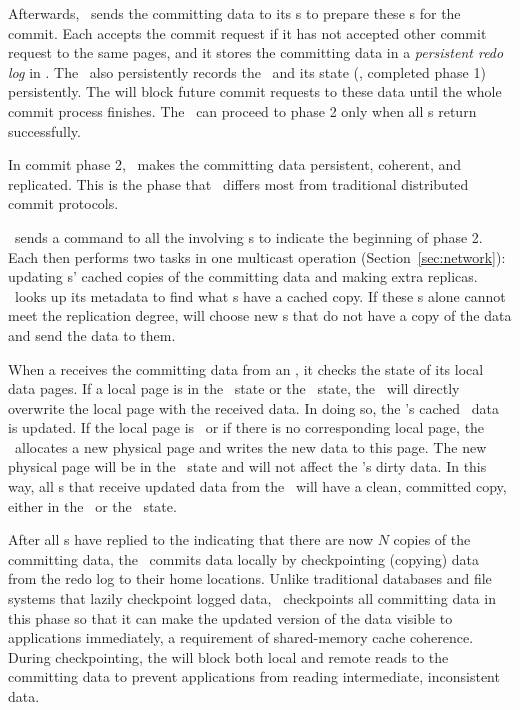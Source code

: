 Afterwards, \xn\ sends the committing data to its \on{}s 
to prepare these \on{}s for the commit.
Each \on{} accepts the commit request if it has not accepted other commit request to the same pages,
and it stores the committing data in a {\em persistent redo log} in \nvm.
The \on\ also persistently records the \xactid\ and its state (\ie, completed phase 1) persistently.
The \on{} will block future commit requests to these data until the whole commit process finishes.
The \xn\ can proceed to phase 2 only when all \on{}s return successfully.

In commit phase 2, \hotpot\ makes the committing data persistent, 
coherent, and replicated.
This is the phase that \hotpot\ differs most from traditional distributed commit protocols.

\xn\ sends a command to all the involving \on{}s to indicate the beginning of phase 2.  
Each \on{} then performs two tasks in one multicast operation (Section~\ref{sec:network}): 
updating \dn{}s' cached copies of the committing data and making extra replicas.
\on\ looks up its metadata to find what \dn{}s have a cached copy.
If these \dn{}s alone cannot meet the replication degree, \on{} will choose new \dn{}s that do not have
a copy of the data and send the data to them.

When a \dn{} receives the committing data from an \on,
it checks the state of its local data pages.
If a local page is in the \committed\ state or the \redundant\ state, 
the \dn\ will directly overwrite the local page with the received data.
In doing so, the \dn's cached \nvm\ data is updated.
If the local page is \dirty\  or if there is no corresponding local page,
the \dn\ allocates a new physical page and writes the new data to this page.
The new physical page will be in the \redundant\ state and will not affect the \dn's dirty data.
In this way, all \dn{}s that receive updated data from the \on\ will 
have a clean, committed copy, either in the \committed\ or the \redundant\ state.

After all \dn{}s have replied to the \on{} indicating that there are now $N$ copies of the committing data,
the \on\ commits data locally
by checkpointing (copying) data from the redo log to their home locations.
Unlike traditional databases and file systems that lazily checkpoint logged data, 
\hotpot\ checkpoints all committing data in this phase 
so that it can make the updated version of the data
visible to applications immediately, 
a requirement of shared-memory cache coherence.
During checkpointing, the \on{} will block both local and remote reads to the committing data
to prevent applications from reading intermediate, inconsistent data.

